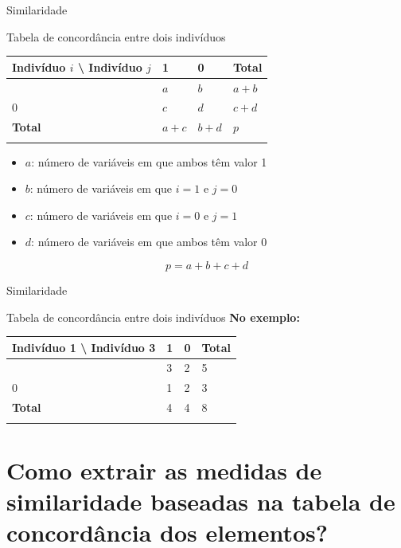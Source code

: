 \documentclass[
  ignorenonframetext,
  aspectratio=169,
]{beamer}
\providecommand{\tightlist}{%
  \setlength{\itemsep}{0pt}\setlength{\parskip}{0pt}}
\begin{document}
\begin{frame}{Similaridade}
\label{similaridade-9}
\begin{block}{Tabela de concordância entre dois indivíduos}
\label{tabela-de-concorduxe2ncia-entre-dois-indivuxedduos}
\begin{longtable}[]{@{}llll@{}}
\toprule\noalign{}
Indivíduo \(i\) \textbackslash{} Indivíduo \(j\) & 1 & 0 & Total \\
\midrule\noalign{}
\endhead
1 & \(a\) & \(b\) & \(a + b\) \\
0 & \(c\) & \(d\) & \(c + d\) \\
\textbf{Total} & \(a + c\) & \(b + d\) & \(p\) \\
\bottomrule\noalign{}
\end{longtable}

\begin{itemize}
\tightlist
\item
  \(a\): número de variáveis em que ambos têm valor 1
\item
  \(b\): número de variáveis em que \(i=1\) e \(j=0\)
\item
  \(c\): número de variáveis em que \(i=0\) e \(j=1\)
\item
  \(d\): número de variáveis em que ambos têm valor 0
\end{itemize}

\[p = a + b + c + d\]
\end{block}
\end{frame}

\begin{frame}{Similaridade}
\label{similaridade-10}
\begin{block}{Tabela de concordância entre dois indivíduos}
\label{tabela-de-concorduxe2ncia-entre-dois-indivuxedduos-1}
\textbf{No exemplo:}

\begin{longtable}[]{@{}llll@{}}
\toprule\noalign{}
Indivíduo 1 \textbackslash{} Indivíduo 3 & 1 & 0 & Total \\
\midrule\noalign{}
\endhead
1 & 3 & 2 & 5 \\
0 & 1 & 2 & 3 \\
\textbf{Total} & 4 & 4 & 8 \\
\bottomrule\noalign{}
\end{longtable}
\end{block}
\end{frame}

\section{\texorpdfstring{Como extrair as \textbf{medidas de
similaridade} baseadas na \textbf{tabela de concordância} dos
elementos?}{Como extrair as medidas de similaridade baseadas na tabela de concordância dos elementos?}}\label{como-extrair-as-medidas-de-similaridade-baseadas-na-tabela-de-concorduxe2ncia-dos-elementos}
\end{document}
